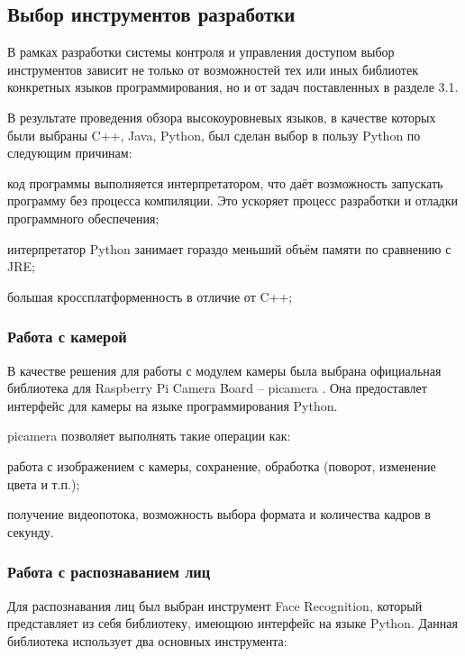 \subsection{Выбор инструментов разработки}

В рамках разработки системы контроля и управления доступом выбор инструментов зависит не только от возможностей тех или иных библиотек конкретных языков программирования, но и от задач поставленных в разделе 3.1.

В результате проведения обзора высокоуровневых языков, в качестве которых были выбраны C++, Java, Python, был сделан выбор в пользу Python по следующим причинам:

\begin{itemize*}
\item код программы выполняется интерпретатором, что даёт возможность запускать программу без процесса компиляции. Это ускоряет процесс разработки и отладки программного обеспечения;
\item интерпретатор Python занимает гораздо меньший объём памяти по сравнению с JRE;
\item большая кроссплатформенность в отличие от C++;
\end{itemize*}

\subsubsection{Работа с камерой}

В качестве решения для работы с модулем камеры была выбрана официальная
библиотека для Raspberry Pi Camera Board -- picamera \cite{picamera}. Она предоставлет интерфейс для камеры на языке программирования Python.

picamera позволяет выполнять такие операции как:

\begin{itemize*}
\item работа с изображением с камеры, сохранение, обработка (поворот, изменение цвета и т.п.);
\item получение видеопотока, возможность выбора формата и количества кадров в секунду.
\end{itemize*}

\subsubsection{Работа с распознаванием лиц}

Для распознавания лиц был выбран инструмент Face Recognition, который представляет из себя библиотеку, имеющюю интерфейс на языке Python. Данная библиотека использует два основных инструмента:

